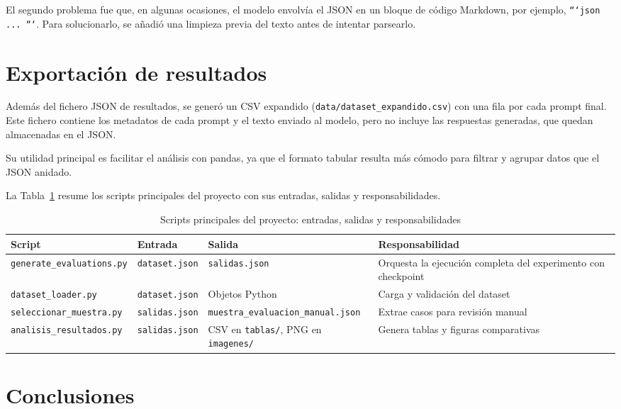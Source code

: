 \documentclass[12pt]{report} %
\renewcommand{\_}{\oldunderscore\allowbreak}
\begin{document}
El segundo problema fue que, en algunas ocasiones, el modelo envolvía el JSON en un bloque de código Markdown, por ejemplo, \texttt{```json ... ```}. Para solucionarlo, se añadió una limpieza previa del texto antes de intentar parsearlo.

\section{Exportación de resultados}

Además del fichero JSON de resultados, se generó un CSV expandido (\nolinkurl{data/dataset_expandido.csv}) con una fila por cada prompt final. Este fichero contiene los metadatos de cada prompt y el texto enviado al modelo, pero no incluye las respuestas generadas, que quedan almacenadas en el JSON.

Su utilidad principal es facilitar el análisis con pandas, ya que el formato tabular resulta más cómodo para filtrar y agrupar datos que el JSON anidado.

La Tabla~\ref{tab:scripts_principales} resume los scripts principales del proyecto con sus entradas, salidas y responsabilidades.

\begin{table}[H]
\centering
\footnotesize
\begin{tabular}{p{3.8cm}p{2.4cm}p{3.3cm}p{3.3cm}}
\hline
\textbf{Script} & \textbf{Entrada} & \textbf{Salida} & \textbf{Responsabilidad} \\
\hline
\nolinkurl{generate_evaluations.py} & \nolinkurl{dataset.json} & \nolinkurl{salidas.json} & Orquesta la ejecución completa del experimento con checkpoint \\
\nolinkurl{dataset_loader.py} & \nolinkurl{dataset.json} & Objetos Python & Carga y validación del dataset \\
\nolinkurl{seleccionar_muestra.py} & \nolinkurl{salidas.json} & \nolinkurl{muestra_evaluacion_manual.json} & Extrae casos para revisión manual \\
\nolinkurl{analisis_resultados.py} & \nolinkurl{salidas.json} & CSV en \nolinkurl{tablas/}, PNG en \nolinkurl{imagenes/} & Genera tablas y figuras comparativas \\
\hline
\end{tabular}
\caption{Scripts principales del proyecto: entradas, salidas y responsabilidades}
\label{tab:scripts_principales}
\end{table}

\section{Conclusiones}
\end{document}
